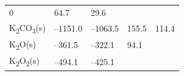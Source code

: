 \documentclass[
]{book}
\theoremstyle{definition}
\theoremstyle{definition}
\theoremstyle{definition}
\theoremstyle{remark}
\begin{document}
\begin{longtable}[]{@{}lllll@{}}
\begin{minipage}[t]{0.20\columnwidth}
0\strut
\end{minipage} & \begin{minipage}[t]{0.18\columnwidth}\raggedright
64.7\strut
\end{minipage} & \begin{minipage}[t]{0.18\columnwidth}\raggedright
29.6\strut
\end{minipage}\tabularnewline
\begin{minipage}[t]{0.10\columnwidth}\raggedright
K\textsubscript{2}CO\textsubscript{3}(s)\strut
\end{minipage} & \begin{minipage}[t]{0.19\columnwidth}\raggedright
--1151.0\strut
\end{minipage} & \begin{minipage}[t]{0.20\columnwidth}\raggedright
--1063.5\strut
\end{minipage} & \begin{minipage}[t]{0.18\columnwidth}\raggedright
155.5\strut
\end{minipage} & \begin{minipage}[t]{0.18\columnwidth}\raggedright
114.4\strut
\end{minipage}\tabularnewline
\begin{minipage}[t]{0.10\columnwidth}\raggedright
K\textsubscript{2}O(s)\strut
\end{minipage} & \begin{minipage}[t]{0.19\columnwidth}\raggedright
--361.5\strut
\end{minipage} & \begin{minipage}[t]{0.20\columnwidth}\raggedright
--322.1\strut
\end{minipage} & \begin{minipage}[t]{0.18\columnwidth}\raggedright
94.1\strut
\end{minipage} & \begin{minipage}[t]{0.18\columnwidth}\raggedright
\strut
\end{minipage}\tabularnewline
\begin{minipage}[t]{0.10\columnwidth}\raggedright
K\textsubscript{2}O\textsubscript{2}(s)\strut
\end{minipage} & \begin{minipage}[t]{0.19\columnwidth}\raggedright
--494.1\strut
\end{minipage} & \begin{minipage}[t]{0.20\columnwidth}\raggedright
--425.1\strut
\end{minipage} & \begin{minipage}[t]{0.18\columnwidth}\raggedright

\end{minipage}
\end{longtable}
\end{document}
